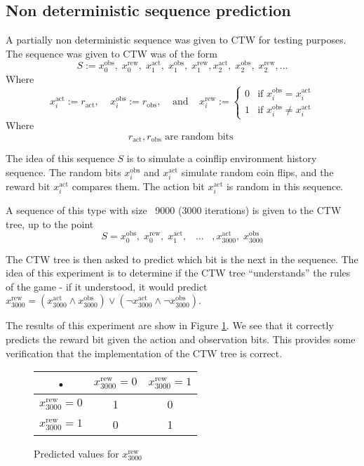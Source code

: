 \documentclass[pdftex,twoside,a4paper]{report}
\newcommand{\bcen}{\begin{center}}
\newcommand{\ecen}{\end{center}}
\begin{document}
\subsection{Non deterministic sequence prediction}
A partially non deterministic sequence was given to CTW for testing purposes. The sequence was given to CTW was of the form\\
\[
S := x^{\text{obs}}_0,\; x^{\text{rew}}_0,\; x^{\text{act}}_1,\; x^{\text{obs}}_1,\; x^{\text{rew}}_1, x^{\text{act}}_2,\; x^{\text{obs}}_2,\; x^{\text{rew}}_2, ...
\]
Where\\
\[
x^{\text{act}}_i := r_{\text{act}}, \;\;\;\; x^{\text{obs}}_i := r_{\text{obs}}, \;\;\;\; \text{and} \;\;\;\;
x^{\text{rew}}_i :=
\begin{cases}
0 & \text{if } x^{\text{obs}}_i = x^{\text{act}}_i\\
1 & \text{if } x^{\text{obs}}_i \not= x^{\text{act}}_i
\end{cases}
\]
Where\\
\[
r_\text{act}, r_\text{obs} \text{ are random bits }
\]

The idea of this sequence $S$ is to simulate a coinflip environment history sequence. The random bits $x^{\text{obs}}_i$ and $x^{\text{act}}_i$ simulate random coin flips, and the reward bit $x^{\text{act}}_i$ compares them. The action bit $x^{\text{act}}_i$ is random in this sequence.

A sequence of this type with size ~9000 (3000 iterations) is given to the CTW tree, up to the point
\[
S = x^{\text{obs}}_0,\; x^{\text{rew}}_0,\; x^{\text{act}}_1,\;\;\;...\;\;\;,x^{\text{act}}_{3000},\;x^{\text{obs}}_{3000}
\]

The CTW tree is then asked to predict which bit is the next in the sequence. The idea of this experiment is to determine if the CTW tree ``understands'' the rules of the game - if it understood, it would predict $x^{\text{rew}}_{3000} = (x^{\text{act}}_{3000} \land x^{\text{obs}}_{3000}) \lor (\lnot x^{\text{act}}_{3000} \land \lnot x^{\text{obs}}_{3000})$.

The results of this experiment are show in Figure \ref{tab:non_det_seq_pred}. We see that it correctly predicts the reward bit given the action and observation bits. This provides some verification that the implementation of the CTW tree is correct.
\begin{figure}
\bcen
\bgroup
\def\arraystretch{1.5}
\begin{tabular}{c |c| c }
 • & $x^{\text{rew}}_{3000} = 0$ & $x^{\text{rew}}_{3000} = 1$ \\ 
\hline $x^{\text{rew}}_{3000} = 0$ & 1 & 0 \\ 
\hline $x^{\text{rew}}_{3000} = 1$ & 0 & 1 \\  
\end{tabular}
\egroup
\ecen
\caption{Predicted values for $x^{\text{rew}}_{3000}$}
\label{tab:non_det_seq_pred}
\end{figure}
\end{document}
